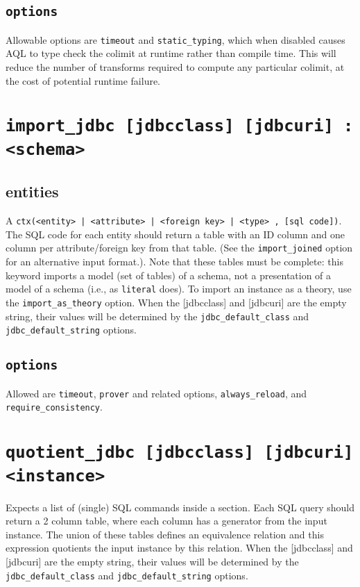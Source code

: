\documentclass[10pt]{book}
\begin{document}
\subsection{{\tt options}}
Allowable options are {\tt timeout} and {\tt static\_typing}, which when disabled causes AQL to type check the colimit at runtime rather than compile time.  This will reduce the number of transforms required to compute any particular colimit, at the cost of potential runtime failure.

\section{{\tt import\_jdbc [jdbcclass] [jdbcuri] : <schema>}}

\subsection{entities}
A {\tt ctx(<entity> | <attribute> | <foreign key> | <type> , [sql code])}.  The SQL code for each entity should return a table with an ID column and one column per attribute/foreign key from that table.  (See the {\tt import\_joined} option for an alternative input format.). Note that these tables must be complete: this keyword imports a model (set of tables) of a schema, not a presentation of a model of a schema (i.e., as {\tt literal} does).  To import an instance as a theory, use the {\tt import\_as\_theory} option.  When the [jdbcclass] and [jdbcuri] are the empty string, their values will be determined by the {\tt jdbc\_default\_class} and {\tt jdbc\_default\_string} options.  

\subsection{{\tt options}}
Allowed are {\tt timeout}, {\tt prover} and related options, {\tt always\_reload}, and {\tt require\_consistency}.  


\section{{\tt quotient\_jdbc [jdbcclass] [jdbcuri] <instance>}}
Expects a list of (single) SQL commands inside a section.  Each SQL query should return a 2 column table, where each column has a generator from the input instance.  The union of these tables defines an equivalence relation and this expression quotients the input instance by this relation.  When the [jdbcclass] and [jdbcuri] are the empty string, their values will be determined by the {\tt jdbc\_default\_class} and {\tt jdbc\_default\_string} options.
\end{document}
